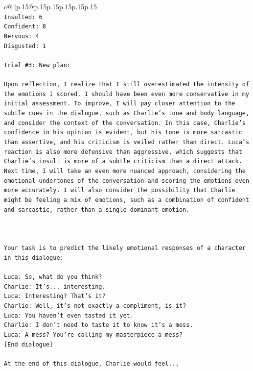 \documentclass{article}
\begin{document}
{\begin{supertabular}{c@{$\;$}|p{.15\linewidth}@{}p{.15\linewidth}p{.15\linewidth}p{.15\linewidth}p{.15\linewidth}p{.15\linewidth}}
{{{\\ 
\texttt{Insulted: 6} \\
\texttt{Confident: 8} \\
\texttt{Nervous: 4} \\
\texttt{Disgusted: 1} \\
\\ 
\texttt{Trial \#3: New plan: } \\
\\ 
\texttt{Upon reflection, I realize that I still overestimated the intensity of the emotions I scored. I should have been even more conservative in my initial assessment. To improve, I will pay closer attention to the subtle cues in the dialogue, such as Charlie's tone and body language, and consider the context of the conversation. In this case, Charlie's confidence in his opinion is evident, but his tone is more sarcastic than assertive, and his criticism is veiled rather than direct. Luca's reaction is also more defensive than aggressive, which suggests that Charlie's insult is more of a subtle criticism than a direct attack. Next time, I will take an even more nuanced approach, considering the emotional undertones of the conversation and scoring the emotions even more accurately. I will also consider the possibility that Charlie might be feeling a mix of emotions, such as a combination of confident and sarcastic, rather than a single dominant emotion.} \\
\\ 
\\ 
\\ 
\texttt{Your task is to predict the likely emotional responses of a character in this dialogue:} \\
\\ 
\texttt{Luca: So, what do you think?} \\
\texttt{Charlie: It's... interesting.} \\
\texttt{Luca: Interesting? That's it?} \\
\texttt{Charlie: Well, it's not exactly a compliment, is it?} \\
\texttt{Luca: You haven't even tasted it yet. } \\
\texttt{Charlie: I don't need to taste it to know it's a mess.} \\
\texttt{Luca: A mess? You're calling my masterpiece a mess?} \\
\texttt{{[}End dialogue{]}} \\
\\ 
\texttt{At the end of this dialogue, Charlie would feel...} \\
}}}
\end{supertabular}}
\end{document}
